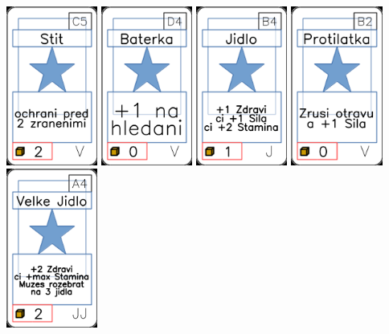 \documentclass[a4paper]{article}
\begin{document}
	\includegraphics[width=3.0cm]{img-1_74}
	\includegraphics[width=3.0cm]{img-1_78}
	\includegraphics[width=3.0cm]{img-1_8}
	\includegraphics[width=3.0cm]{img-1_66}
	\includegraphics[width=3.0cm]{img-1_33}
\end{document}
